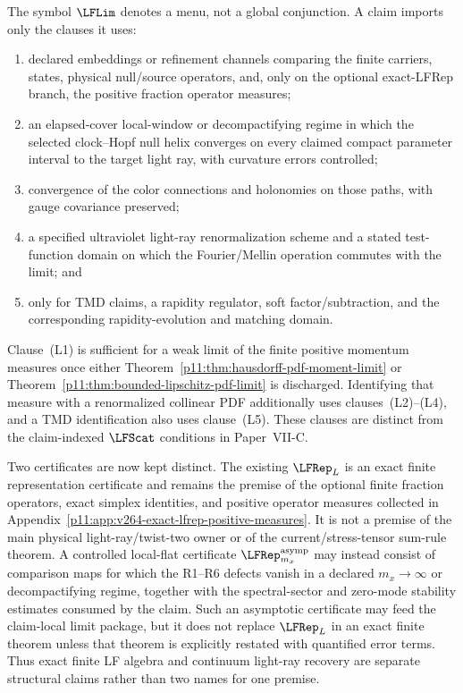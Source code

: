 \documentclass[12pt,a4paper]{article}
\begin{document}
\begin{definition}
\label{p11:def:claim-local-lf-limit-package}
The symbol \(\LFLim\) denotes a menu, not a global conjunction.  A claim
imports only the clauses it uses:
\begin{enumerate}[label=\textnormal{(L\arabic*)},leftmargin=2.8em]
\item declared embeddings or refinement channels comparing the finite
carriers, states, physical null/source operators, and, only on the optional
exact-LFRep branch, the positive fraction operator measures;
\item an elapsed-cover local-window or decompactifying regime in which the
selected clock--Hopf null helix converges on every claimed compact parameter
interval to the target light ray, with curvature errors controlled;
\item convergence of the color connections and holonomies on those paths,
with gauge covariance preserved;
\item a specified ultraviolet light-ray renormalization scheme and a stated
test-function domain on which the Fourier/Mellin operation commutes with the
limit; and
\item only for TMD claims, a rapidity regulator, soft factor/subtraction, and
the corresponding rapidity-evolution and matching domain.
\end{enumerate}
Clause~\textnormal{(L1)} is sufficient for a weak limit of the finite positive
momentum measures once either
Theorem~\ref{p11:thm:hausdorff-pdf-moment-limit} or
Theorem~\ref{p11:thm:bounded-lipschitz-pdf-limit} is discharged.
Identifying that measure with a renormalized collinear PDF additionally uses
clauses~\textnormal{(L2)--(L4)}, and a TMD identification also uses
clause~\textnormal{(L5)}.  These clauses are distinct from the claim-indexed
\(\LFScat\) conditions in Paper~VII-C.
\end{definition}


\begin{remark}
\label{p11:rem:v186-exact-asymptotic-lfrep-split}
Two certificates are now kept distinct.  The existing $\LFRep_L$ is an exact
finite representation certificate and remains the premise of the optional
finite fraction operators, exact simplex identities, and positive operator
measures collected in Appendix~\ref{p11:app:v264-exact-lfrep-positive-measures}.
It is not a premise of the main physical light-ray/twist-two owner or of the
current/stress-tensor sum-rule theorem.  A controlled local-flat certificate
$\LFRep^{\rm asymp}_{m_x}$ may instead consist of comparison maps for which the
R1--R6 defects vanish in a declared $m_x\to\infty$ or decompactifying regime,
together with the spectral-sector and zero-mode stability estimates consumed
by the claim.  Such an asymptotic certificate may feed the claim-local limit
package, but it does not replace $\LFRep_L$ in an exact finite theorem unless
that theorem is explicitly restated with quantified error terms.  Thus exact
finite LF algebra and continuum light-ray recovery are separate structural
claims rather than two names for one premise.
\end{remark}
\end{document}
